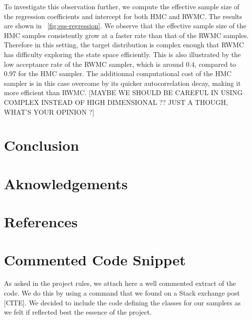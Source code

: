 \documentclass[a4paper, 12pt,oneside]{article}
\begin{document}
		To investigate this observation further, we compute the effective sample size of the regression coefficients and intercept for both HMC and RWMC. The results are shown in ~\ref{fig:ess-regression}. We observe that the effective sample size of the HMC samples consistently grow at a faster rate than that of the RWMC samples. Therefore in this setting, the target distribution is complex enough that RWMC has difficulty exploring the state space efficiently. This is also illustrated by the low acceptance rate of the RWMC sampler, which is around $0.4$, compared to 0.97 for the HMC sampler. The additionnal computational cost of the HMC sampler is in this case overcome by its quicker autocorrelation decay, making it more efficient than RWMC. [MAYBE WE SHOULD BE CAREFUL IN USING COMPLEX INSTEAD OF HIGH DIMENSIONAL ?? JUST A THOUGH, WHAT'S YOUR OPINION ?]
	\section{Conclusion}
	\section*{Aknowledgements}
	\newpage
	\section*{References}
	\appendix
		\section{Commented Code Snippet}\label{appendix:commented-code-snippet}
		As asked in the project rules, we attach here a well commented extract of the code. We do this by using a command that we found on a Stack exchange post [CITE]. We decided to include the code defining the classes for our samplers as we felt if reflected best the essence of the project.
\end{document}
